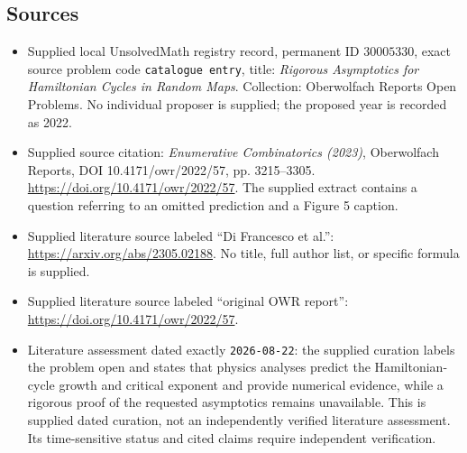 \documentclass[11pt]{article}
\begin{document}
\subsection{Sources}
\begin{itemize}
\item Supplied local UnsolvedMath registry record, permanent ID \(30005330\), exact source problem code \texttt{catalogue entry}, title: \emph{Rigorous Asymptotics for Hamiltonian Cycles in Random Maps}. Collection: Oberwolfach Reports Open Problems. No individual proposer is supplied; the proposed year is recorded as 2022.
\item Supplied source citation: \emph{Enumerative Combinatorics (2023)}, Oberwolfach Reports, DOI 10.4171/owr/2022/57, pp. 3215--3305. \url{https://doi.org/10.4171/owr/2022/57}. The supplied extract contains a question referring to an omitted prediction and a Figure 5 caption.
\item Supplied literature source labeled ``Di Francesco et al.'': \url{https://arxiv.org/abs/2305.02188}. No title, full author list, or specific formula is supplied.
\item Supplied literature source labeled ``original OWR report'': \url{https://doi.org/10.4171/owr/2022/57}.
\item Literature assessment dated exactly \texttt{2026-08-22}: the supplied curation labels the problem open and states that physics analyses predict the Hamiltonian-cycle growth and critical exponent and provide numerical evidence, while a rigorous proof of the requested asymptotics remains unavailable. This is supplied dated curation, not an independently verified literature assessment. Its time-sensitive status and cited claims require independent verification.
\end{itemize}
\end{document}
